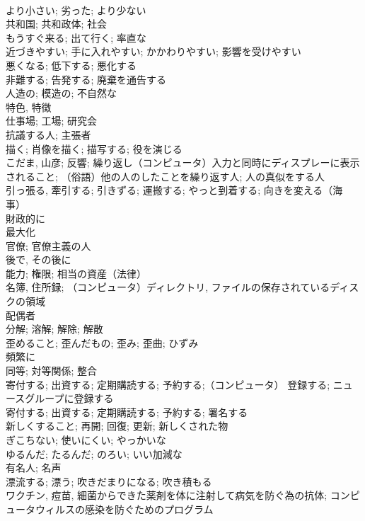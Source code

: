 \documentclass[8pt]{extreport}
\begin{document}
\begin{CJK}{UTF8}{min}
\\	より小さい; 劣った; より少ない	
\\	共和国; 共和政体; 社会	
\\	もうすぐ来る; 出て行く; 率直な	
\\	近づきやすい; 手に入れやすい; かかわりやすい; 影響を受けやすい	
\\	悪くなる; 低下する; 悪化する	
\\	非難する; 告発する; 廃棄を通告する	
\\	人造の; 模造の; 不自然な	
\\	特色, 特徴	
\\	仕事場; 工場; 研究会	
\\	抗議する人; 主張者	
\\	描く; 肖像を描く; 描写する; 役を演じる	
\\	こだま, 山彦; 反響; 繰り返し（コンピュータ）入力と同時にディスプレーに表示されること; （俗語）他の人のしたことを繰り返す人; 人の真似をする人	
\\	引っ張る, 牽引する; 引きずる; 運搬する; やっと到着する; 向きを変える（海事）	
\\	財政的に	
\\	最大化	
\\	官僚; 官僚主義の人	
\\	後で, その後に	
\\	能力; 権限; 相当の資産（法律）	
\\	名簿, 住所録; （コンピュータ）ディレクトリ, ファイルの保存されているディスクの領域	
\\	配偶者	
\\	分解; 溶解; 解除; 解散	
\\	歪めること; 歪んだもの; 歪み; 歪曲; ひずみ	
\\	頻繁に	
\\	同等; 対等関係; 整合	
\\	寄付する; 出資する; 定期購読する; 予約する;（コンピュータ） 登録する; ニュースグループに登録する 
\\	寄付する; 出資する; 定期購読する; 予約する; 署名する	
\\	新しくすること; 再開; 回復; 更新; 新しくされた物	
\\	ぎこちない; 使いにくい; やっかいな	
\\	ゆるんだ; たるんだ; のろい; いい加減な	
\\	有名人; 名声	
\\	漂流する; 漂う; 吹きだまりになる; 吹き積もる	
\\	ワクチン, 痘苗, 細菌からできた薬剤を体に注射して病気を防ぐ為の抗体; コンピュータウィルスの感染を防ぐためのプログラム	

\end{CJK}
\end{document}
